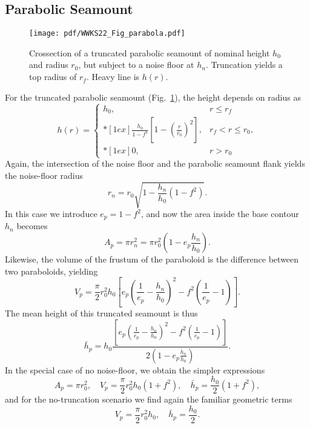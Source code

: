 \subsection{Parabolic Seamount}

\begin{figure}[h]
\centering
\texttt{[image: pdf/WWKS22\_Fig\_parabola.pdf]}
\caption{Crossection of a truncated parabolic seamount of nominal height $h_0$ and radius $r_0$, but
subject to a noise floor at $h_n$.  Truncation yields a top radius of $r_f$. Heavy line is $h(r)$.}
\label{WWKS22_Fig_parabola}
\end{figure}
For the truncated parabolic seamount (Fig.~\ref{WWKS22_Fig_parabola}), the height depends on radius as
\begin{equation*}
h(r) = \left \{ \begin{array}{cl}
	h_0, &	r \leq r_f \\*[1ex]
	\displaystyle \frac{h_0}{1-f^2} \left [1 - \left (\frac{r}{r_0} \right )^2 \right ], & r_f < r \leq r_0, \\*[1ex]
	0, & r > r_0
\end{array} \right.
\end{equation*}
Again, the intersection of the noise floor and the parabolic seamount flank yields the noise-floor
radius
\begin{equation*}
r_n = r_0 \sqrt{1 - \frac{h_n}{h_0}\left (1 - f^2 \right )}.
\end{equation*}
In this case we introduce $e_p = 1 - f^2$, and now the area inside the base contour $h_n$ becomes
\begin{equation}
A_p = \pi r_n^2 = \pi r_0^2 \left ( 1 - e_p \frac{h_n}{h_0} \right ).
\end{equation}
Likewise, the volume of the frustum of the paraboloid is the difference between two paraboloids, yielding
\begin{equation}
V_p = \frac{\pi}{2}r_0^2h_0 \left [ e_p \left (\frac{1}{e_p} - \frac{h_n}{h_0} \right )^2 - f^2 \left (\frac{1}{e_p} - 1 \right ) \right ].
\end{equation}
The mean height of this truncated seamount is thus
\begin{equation}
\bar{h}_p =  h_0 \frac{ \left [ e_p \left ( \frac{1}{e_p} - \frac{h_n}{h_0} \right )^2 -  f^2 \left (\frac{1}{e_p} - 1 \right ) \right ]}{2 \left ( 1 - e_p \frac{h_n}{h_0} \right )}.
\end{equation}
In the special case of no noise-floor, we obtain the simpler expressions
\begin{equation*}
A_p = \pi r_0^2,	\quad V_p = \frac{\pi}{2} r_0^2 h_0 \left (1 + f^2 \right ), \quad \bar{h}_p =  \frac{h_0}{2}\left (1 + f^2 \right ),
\end{equation*}
and for the no-truncation scenario we find again the familiar geometric terms
\begin{equation*}
V_p = \frac{\pi}{2}r_0^2h_0, \quad \bar{h}_p =  \frac{h_0}{2}.
\end{equation*}

